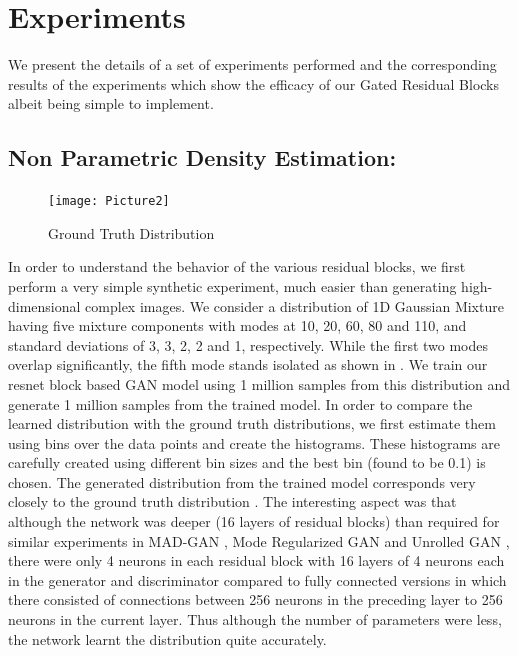 
\section{Experiments}
We present the details of a set of experiments performed and the corresponding results of the experiments which show the efficacy of our Gated Residual Blocks albeit being simple to implement.

\subsection{Non Parametric Density Estimation:}
\begin{figure}
    \centering
    \texttt{[image: Picture2]}
    \caption{Ground Truth Distribution }\label{fig:1d_ground}
    \vspace{-4mm}
\end{figure}
In order to understand the behavior of the various residual blocks, we first perform a very simple synthetic experiment, much easier than generating high-dimensional complex images. We consider a distribution of 1D Gaussian Mixture \cite{bishop2007pattern} having five mixture components with modes at 10, 20, 60, 80 and 110, and standard deviations of 3, 3, 2, 2 and 1, respectively. While the first two modes overlap significantly, the fifth mode stands isolated as shown in . We train our resnet block based GAN model using 1 million samples from this distribution and generate 1 million samples from the trained model. In order to compare the learned distribution with the ground truth distributions, we first estimate them using bins over the data points and create the histograms. These histograms are carefully created using different bin sizes and the best bin (found to be 0.1) is chosen. The generated distribution from the trained model corresponds very closely to the ground truth distribution . The interesting aspect was that although the network was deeper (16 layers of residual blocks) than required for similar experiments in MAD-GAN \cite{ghosh2017multi}, Mode Regularized GAN \cite{che2016mode} and Unrolled GAN \cite{metz2017unrolledGAN}, there were only 4 neurons in each residual block with 16 layers of 4 neurons each in the generator and discriminator compared to fully connected versions in which there consisted of connections between 256 neurons in the preceding layer to 256 neurons in the current layer. Thus although the number of parameters were less, the network learnt the distribution quite accurately.

